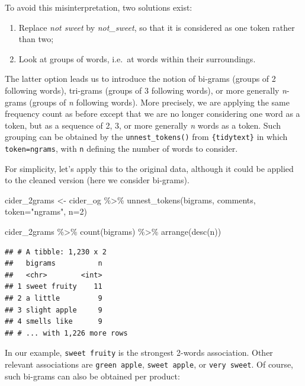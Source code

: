 \documentclass[
]{krantz}
\makeatletter
\newenvironment{Shaded}{\begin{snugshade}}{\end{snugshade}}
\newcommand{\AttributeTok}[1]{\textcolor[rgb]{0.61,0.61,0.61}{#1}}
\newcommand{\DecValTok}[1]{\textcolor[rgb]{0.06,0.06,0.06}{#1}}
\newcommand{\FunctionTok}[1]{\textcolor[rgb]{0,0,0}{#1}}
\newcommand{\NormalTok}[1]{#1}
\newcommand{\OtherTok}[1]{\textcolor[rgb]{0.37,0.37,0.37}{#1}}
\newcommand{\SpecialCharTok}[1]{\textcolor[rgb]{0,0,0}{#1}}
\newcommand{\StringTok}[1]{\textcolor[rgb]{0.5,0.5,0.5}{#1}}
\providecommand{\tightlist}{%
  \setlength{\itemsep}{0pt}\setlength{\parskip}{0pt}}
\newenvironment{kframe}{%
\medskip{}
\setlength{\fboxsep}{.8em}
 \def\at@end@of@kframe{}%
 \ifinner\ifhmode%
  \def\at@end@of@kframe{\end{minipage}}%
  \begin{minipage}{\columnwidth}%
 \fi\fi%
 \def\FrameCommand##1{\hskip\@totalleftmargin \hskip-\fboxsep
 \colorbox{shadecolor}{##1}\hskip-\fboxsep
     \hskip-\linewidth \hskip-\@totalleftmargin \hskip\columnwidth}%
 \MakeFramed {\advance\hsize-\width
   \@totalleftmargin\z@ \linewidth\hsize
   \@setminipage}}%
 {\par\unskip\endMakeFramed%
 \at@end@of@kframe}
\renewenvironment{Shaded}{\begin{kframe}}{\end{kframe}}
\makeatother
\begin{document}
To avoid this misinterpretation, two solutions exist:

\begin{enumerate}
\def\labelenumi{\arabic{enumi}.}
\tightlist
\item
  Replace \emph{not sweet} by \emph{not\_sweet}, so that it is considered as one token rather than two;
\item
  Look at groups of words, i.e.~at words within their surroundings.
\end{enumerate}

The latter option leads us to introduce the notion of bi-grams (groups of 2 following words), tri-grams (groups of 3 following words), or more generally \emph{n}-grams (groups of \emph{n} following words). More precisely, we are applying the same frequency count as before except that we are no longer considering one word as a token, but as a sequence of 2, 3, or more generally \emph{n} words as a token. Such grouping can be obtained by the \texttt{unnest\_tokens()} from \texttt{\{tidytext\}} in which \texttt{token=\textquotesingle{}ngrams\textquotesingle{}}, with \texttt{n} defining the number of words to consider.

For simplicity, let's apply this to the original data, although it could be applied to the cleaned version (here we consider bi-grams).

\begin{Shaded}
\begin{Highlighting}[]
\NormalTok{cider\_2grams }\OtherTok{\textless{}{-}}\NormalTok{ cider\_og }\SpecialCharTok{\%\textgreater{}\%} 
  \FunctionTok{unnest\_tokens}\NormalTok{(bigrams, comments, }\AttributeTok{token=}\StringTok{"ngrams"}\NormalTok{, }\AttributeTok{n=}\DecValTok{2}\NormalTok{)}

\NormalTok{cider\_2grams }\SpecialCharTok{\%\textgreater{}\%} 
  \FunctionTok{count}\NormalTok{(bigrams) }\SpecialCharTok{\%\textgreater{}\%} 
  \FunctionTok{arrange}\NormalTok{(}\FunctionTok{desc}\NormalTok{(n))}
\end{Highlighting}
\end{Shaded}

\begin{verbatim}
## # A tibble: 1,230 x 2
##   bigrams          n
##   <chr>        <int>
## 1 sweet fruity    11
## 2 a little         9
## 3 slight apple     9
## 4 smells like      9
## # ... with 1,226 more rows
\end{verbatim}

In our example, \texttt{sweet\ fruity} is the strongest 2-words association. Other relevant associations are \texttt{green\ apple}, \texttt{sweet\ apple}, or \texttt{very\ sweet}.
Of course, such bi-grams can also be obtained per product:
\end{document}
